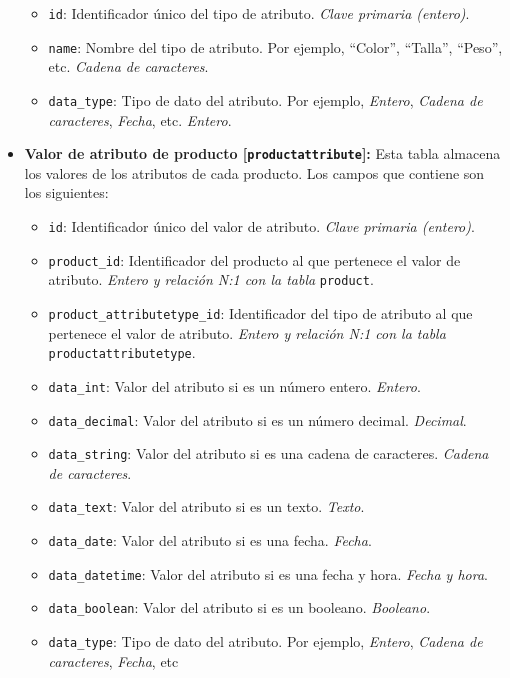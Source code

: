 \begin{itemize}
          \begin{itemize}
              \item \texttt{id}: Identificador único del tipo de atributo. \textit{Clave primaria (entero)}.
              \item \texttt{name}: Nombre del tipo de atributo. Por ejemplo, ``Color'', ``Talla'', ``Peso'', etc. \textit{Cadena de caracteres}.
              \item \texttt{data\_type}: Tipo de dato del atributo. Por ejemplo, \textit{Entero}, \textit{Cadena de caracteres}, \textit{Fecha}, etc. \textit{Entero}.
          \end{itemize}
    \item \textbf{Valor de atributo de producto [\texttt{productattribute}]:} Esta tabla almacena los valores de los atributos de cada producto. Los campos que contiene son los siguientes:
          \begin{itemize}
              \item \texttt{id}: Identificador único del valor de atributo. \textit{Clave primaria (entero)}.
              \item \texttt{product\_id}: Identificador del producto al que pertenece el valor de atributo. \textit{Entero y relación N:1 con la tabla} \texttt{product}.
              \item \texttt{product\_attributetype\_id}: Identificador del tipo de atributo al que pertenece el valor de atributo. \textit{Entero y relación N:1 con la tabla} \texttt{productattributetype}.
              \item \texttt{data\_int}: Valor del atributo si es un número entero. \textit{Entero}.
              \item \texttt{data\_decimal}: Valor del atributo si es un número decimal. \textit{Decimal}.
              \item \texttt{data\_string}: Valor del atributo si es una cadena de caracteres. \textit{Cadena de caracteres}.
              \item \texttt{data\_text}: Valor del atributo si es un texto. \textit{Texto}.
              \item \texttt{data\_date}: Valor del atributo si es una fecha. \textit{Fecha}.
              \item \texttt{data\_datetime}: Valor del atributo si es una fecha y hora. \textit{Fecha y hora}.
              \item \texttt{data\_boolean}: Valor del atributo si es un booleano. \textit{Booleano}.
              \item \texttt{data\_type}: Tipo de dato del atributo. Por ejemplo, \textit{Entero}, \textit{Cadena de caracteres}, \textit{Fecha}, etc

\end{itemize}
\end{itemize}
